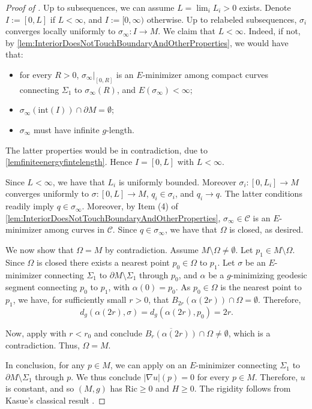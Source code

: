 \documentclass[12pt,a4paper,reqno]{amsart}
\theoremstyle{definition}
\renewcommand{\geq}{\geqslant}
\begin{document}
{\begin{proof}[Proof of ]
{
Up to subsequences, we can assume $L=\lim_i L_i>0$ exists. Denote $I:=[0,L]$ if $L<\infty$, and $I:=[0,\infty)$ otherwise. Up to relabeled subsequences, $\sigma_i$ converges locally uniformly to $\sigma_\infty:I\to M$. We claim that $L<\infty$. Indeed, if not, by \cref{lem:InteriorDoesNotTouchBoundaryAndOtherProperties}, we would have that:
\begin{itemize}
    \item for every $R>0$, $\sigma_\infty|_{[0,R]}$ is an $E$-minimizer among compact curves connecting $\Sigma_1$ to $\sigma_\infty(R)$, and $E(\sigma_\infty)<\infty$;
    \item $\sigma_\infty(\mathrm{int}(I))\cap\partial M = \emptyset$;
    \item $\sigma_\infty$ must have infinite $g$-length.
\end{itemize} 
The latter properties would be in contradiction, due to \cref{lemfiniteenergyfintelength}. Hence $I=[0,L]$ with $L<\infty$. 

Since $L<\infty$, we have that $L_i$ is uniformly bounded. Moreover $\sigma_i:[0,L_i]\to M$ converges uniformly to $\sigma:[0,L]\to M$, $q_i\in \sigma_i$, and $q_i\to q$. The latter conditions readily imply $q\in\sigma_\infty$. Moreover, by Item (4) of \cref{lem:InteriorDoesNotTouchBoundaryAndOtherProperties}, $\sigma_\infty\in\mathcal{C}$ is an $E$-minimizer among curves in $\mathcal{C}$. Since $q\in\sigma_\infty$, we have that $\Omega$ is closed, as desired.
 }

We now show that $\Omega=M$ by contradiction. Assume $M\setminus\Omega\neq \emptyset$. Let $p_1\in M\setminus \Omega$. Since $\Omega$ is closed there exists a nearest point $p_0\in \Omega$ to $p_1$. Let $\sigma$ be an $E$-minimizer connecting $\Sigma_1$ to $\partial M \setminus \Sigma_1$ through $p_0$, and $\alpha$ be a $g$-minimizing geodesic segment connecting $p_0$ to $p_1$, with $\alpha(0)=p_0$. As $p_0\in \Omega$ is the nearest point to $p_1$, we have, for sufficiently small $r>0$, that $B_{2r}(\alpha(2r))\cap\Omega=\emptyset$. Therefore,
\[
d_g(\alpha(2r),\sigma)=d_g(\alpha(2r), p_0)=2r.
\]

Now, apply  with $r<r_0$ and conclude $\overline{B_r(\alpha(2r))}\cap \Omega\neq \emptyset$, which is a contradiction. Thus, $\Omega =M$.

In conclusion, for any $p\in M$, we can apply  on an $E$-minimizer connecting $\Sigma_1$ to $\partial M\setminus \Sigma_1$ through $p$. We thus conclude $|\nabla u|(p)=0$ for every $p\in M$. Therefore, $u$ is constant, and so $(M,g)$ has $\mathrm{Ric}\geq 0$ and $H\geq 0$. The rigidity follows from Kasue's classical result \cite[Theorem B(1)]{Kasue83}.
\end{proof}

}
\end{document}
